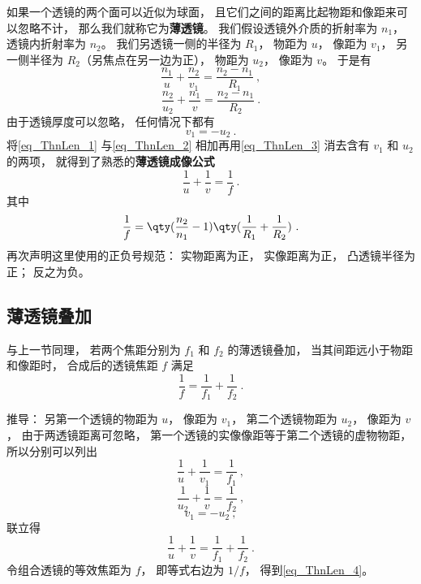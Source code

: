 如果一个透镜的两个面可以近似为球面， 且它们之间的距离比起物距和像距来可以忽略不计， 那么我们就称它为\textbf{薄透镜}。 我们假设透镜外介质的折射率为 $n_1$， 透镜内折射率为 $n_2$。 我们另透镜一侧的半径为 $R_1$， 物距为 $u$， 像距为 $v_1$， 另一侧半径为 $R_2$（另焦点在另一边为正）， 物距为 $u_2$， 像距为 $v$。 于是有
\begin{equation}\label{eq_ThnLen_1}
\frac{n_1}{u} + \frac{n_2}{v_1} = \frac{n_2 - n_1}{R_1}~,
\end{equation}
\begin{equation}\label{eq_ThnLen_2}
\frac{n_2}{u_2} + \frac{n_1}{v} = \frac{n_2 - n_1}{R_2}~.
\end{equation}
由于透镜厚度可以忽略， 任何情况下都有
\begin{equation}\label{eq_ThnLen_3}
v_1 = -u_2~.
\end{equation}
将\autoref{eq_ThnLen_1} 与\autoref{eq_ThnLen_2} 相加再用\autoref{eq_ThnLen_3} 消去含有 $v_1$ 和 $u_2$ 的两项， 就得到了熟悉的\textbf{薄透镜成像公式}
\begin{equation}
\frac{1}{u} + \frac{1}{v} = \frac{1}{f}~.
\end{equation}
其中
\begin{equation}
\frac{1}{f} = \qty(\frac{n_2}{n_1} - 1) \qty(\frac{1}{R_1} + \frac{1}{R_2})~.
\end{equation}
再次声明这里使用的正负号规范： 实物距离为正， 实像距离为正， 凸透镜半径为正； 反之为负。


\subsection{薄透镜叠加}
与上一节同理， 若两个焦距分别为 $f_1$ 和 $f_2$ 的薄透镜叠加， 当其间距远小于物距和像距时， 合成后的透镜焦距 $f$ 满足
\begin{equation}\label{eq_ThnLen_4}
\frac{1}{f} = \frac{1}{f_1} + \frac{1}{f_2}~.
\end{equation}

推导： 另第一个透镜的物距为 $u$， 像距为 $v_1$， 第二个透镜物距为 $u_2$， 像距为 $v$， 由于两透镜距离可忽略， 第一个透镜的实像像距等于第二个透镜的虚物物距， 所以分别可以列出
\begin{equation}
\frac{1}{u} + \frac{1}{v_1} = \frac{1}{f_1}~,
\end{equation}
\begin{equation}
\frac{1}{u_2} + \frac{1}{v} = \frac{1}{f_2}~,
\end{equation}
\begin{equation}
v_1 = -u_2~,
\end{equation}
联立得
\begin{equation}
\frac{1}{u} + \frac{1}{v} = \frac{1}{f_1} + \frac{1}{f_2}~.
\end{equation}
令组合透镜的等效焦距为 $f$， 即等式右边为 $1/f$， 得到\autoref{eq_ThnLen_4}。
